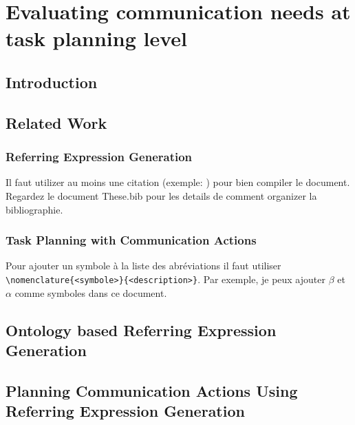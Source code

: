 \documentclass[a4paper,11pt,twoside]{StyleThese}
\begin{document}
\setcounter{chapter}{2} %
\dominitoc
\faketableofcontents
\fi

\chapter{Evaluating communication needs at task planning level}
\minitoc

\section{Introduction}


\section{Related Work}
\subsection{Referring Expression Generation}

Il faut utilizer au moins une citation (exemple: \cite{goossens93}) pour bien
compiler le document. Regardez le document These.bib pour les details de
comment organizer la bibliographie.

\subsection{Task Planning with Communication Actions}

Pour ajouter un symbole à la liste des abréviations il faut utiliser
\verb|\nomenclature{<symbole>}{<description>}|. Par exemple, je peux ajouter
$\beta$ et
$\alpha$ comme
symboles dans ce document.

\section{Ontology based Referring Expression Generation}

\section{Planning Communication Actions Using Referring Expression Generation}

\ifdefined{}
\else


\end{document}
